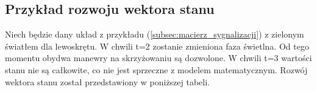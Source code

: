 \documentclass[12pt]{book}
\theoremstyle{plain}
\newcommand{\myref}[1]{(\ref{#1})}
\begin{document}
\subsection{Przykład rozwoju wektora stanu}
Niech będzie dany układ z przykładu \myref{subsec:macierz_sygnalizacji} z zielonym światłem dla lewoskrętu. W chwili t=2 zostanie zmieniona faza świetlna. Od tego momentu obydwa manewry na skrzyżowaniu są dozwolone.  W chwili t=3 wartości stanu nie są całkowite, co nie jest sprzeczne z modelem matematycznym. Rozwój wektora stanu został przedstawiony w poniższej tabeli.

\def \xzero{\begin{bmatrix}
		9 \\ 4 \\ 3 \\ 0 \\ 1 \\ 5
\end{bmatrix}}
\def \xI{\begin{bmatrix}
		0 \\ 12 \\ 1 \\ 3 \\ 0 \\ 1
\end{bmatrix}}
\def \xII{\begin{bmatrix}
		0 \\ 9 \\ 3 \\ 1 \\ 0 \\ 0
\end{bmatrix}}
\def \xIII{\begin{bmatrix}
		0 \\ 0 \\ 2 \frac{1}{4} \\ 3 \\ 7 \frac{3}{4} \\ 0
\end{bmatrix}}

\def \AZero{
	\begin{bmatrix}
		0 & 0            & 0 & 0 & 0 & 0 \\
		1 & \frac{3}{4}  & 0 & 0 & 0 & 0 \\
		0 & \frac{1}{4}  & 0 & 0 & 0 & 0 \\
		0 & 0            & 1 & 0 & 0 & 0 & \\
		0 & 0            & 0 & 0 & 0 & 0 \\
		0 & 0            & 0 & 0 & 1 & 0 \\
	\end{bmatrix}	
}
\end{document}
